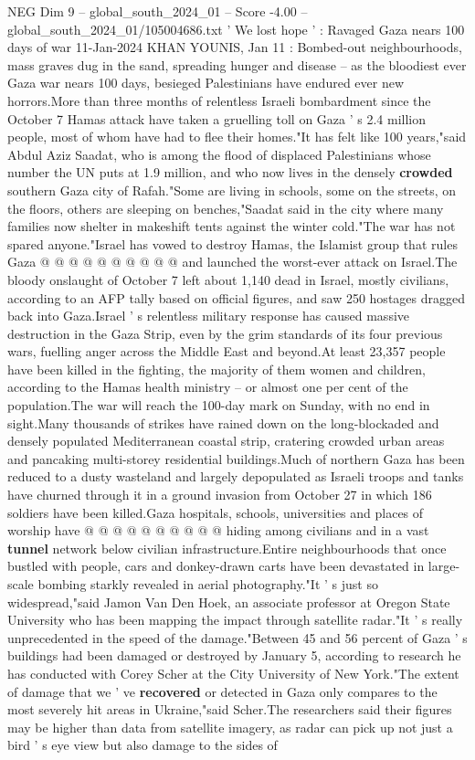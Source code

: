 \begin{textsample}{NEG Dim 9 – global\_south\_2024\_01 – Score -4.00 – global\_south\_2024\_01/105004686.txt}  \label{ex:f9_neg_428}
' We lost hope ' : Ravaged Gaza nears 100 days of war 11-Jan-2024 KHAN YOUNIS, Jan 11 : Bombed-out neighbourhoods, mass graves dug in the sand, spreading hunger and disease -- as the bloodiest ever Gaza war nears 100 days, besieged Palestinians have endured ever new horrors.More than three months of relentless Israeli bombardment since the October 7 Hamas attack have taken a gruelling toll on Gaza ' s 2.4 million people, most of whom have had to flee their homes."It has felt like 100 years,"said Abdul Aziz Saadat, who is among the flood of displaced Palestinians whose number the UN puts at 1.9 million, and who now lives in the densely \textbf{crowded} southern Gaza city of Rafah."Some are living in schools, some on the streets, on the floors, others are sleeping on benches,"Saadat said in the city where many families now shelter in makeshift tents against the winter cold."The war has not spared anyone."Israel has vowed to destroy Hamas, the Islamist group that rules Gaza @ @ @ @ @ @ @ @ @ @ and launched the worst-ever attack on Israel.The bloody onslaught of October 7 left about 1,140 dead in Israel, mostly civilians, according to an AFP tally based on official figures, and saw 250 hostages dragged back into Gaza.Israel ' s relentless military response has caused massive destruction in the Gaza Strip, even by the grim standards of its four previous wars, fuelling anger across the Middle East and beyond.At least 23,357 people have been killed in the fighting, the majority of them women and children, according to the Hamas health ministry -- or almost one per cent of the population.The war will reach the 100-day mark on Sunday, with no end in sight.Many thousands of strikes have rained down on the long-blockaded and densely populated Mediterranean coastal strip, cratering crowded urban areas and pancaking multi-storey residential buildings.Much of northern Gaza has been reduced to a dusty wasteland and largely depopulated as Israeli troops and tanks have churned through it in a ground invasion from October 27 in which 186 soldiers have been killed.Gaza hospitals, schools, universities and places of worship have @ @ @ @ @ @ @ @ @ @ hiding among civilians and in a vast \textbf{tunnel} network below civilian infrastructure.Entire neighbourhoods that once bustled with people, cars and donkey-drawn carts have been devastated in large-scale bombing starkly revealed in aerial photography."It ' s just so widespread,"said Jamon Van Den Hoek, an associate professor at Oregon State University who has been mapping the impact through satellite radar."It ' s really unprecedented in the speed of the damage."Between 45 and 56 percent of Gaza ' s buildings had been damaged or destroyed by January 5, according to research he has conducted with Corey Scher at the City University of New York."The extent of damage that we ' ve \textbf{recovered} or detected in Gaza only compares to the most severely hit areas in Ukraine,"said Scher.The researchers said their figures may be higher than data from satellite imagery, as radar can pick up not just a bird ' s eye view but also damage to the sides of 
\end{textsample}
